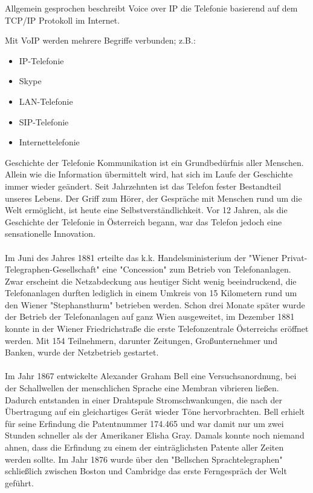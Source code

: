 \label{Grundlagen von VoIP}
	Allgemein gesprochen beschreibt Voice over IP die Telefonie basierend auf dem \ac{TCP/IP} Protokoll im Internet.
	
	Mit VoIP werden mehrere Begriffe verbunden; z.B.:
	\begin{itemize}
		\item \ac{IP}-Telefonie
		\item Skype
		\item \ac{LAN}-Telefonie
		\item \ac{SIP}-Telefonie
		\item Internettelefonie
	\end{itemize}

 \label{Geschichte der Telefonie}
 \begin{section}{Geschichte der Telefonie}
 	Kommunikation ist ein Grundbedürfnis aller Menschen. Allein wie die Information übermittelt wird, 
 	hat sich im Laufe der Geschichte immer wieder geändert. 
 	Seit Jahrzehnten ist das Telefon fester Bestandteil unseres Lebens. 
 	Der Griff zum Hörer, der Gespräche mit Menschen rund um die Welt ermöglicht, 
 	ist heute eine Selbstverständlichkeit. Vor 12 Jahren, 
 	als die Geschichte der Telefonie in Österreich begann, war das Telefon jedoch eine sensationelle Innovation. \\
 	\\
 	Im Juni des Jahres 1881 erteilte das k.k. Handelsministerium der "Wiener Privat-Telegraphen-Gesellschaft" 
 	eine "Concession" zum Betrieb von Telefonanlagen. Zwar erscheint die Netzabdeckung aus 
 	heutiger Sicht wenig beeindruckend, die Telefonanlagen durften lediglich in einem Umkreis 
 	von 15 Kilometern rund um den Wiener "Stephansthurm" betrieben werden. 
 	Schon drei Monate später wurde der Betrieb der Telefonanlagen auf ganz Wien ausgeweitet, 
 	im Dezember 1881 konnte in der Wiener Friedrichstraße die erste Telefonzentrale Österreichs 
 	eröffnet werden. Mit 154 Teilnehmern, darunter Zeitungen, Großunternehmer und Banken, 
 	wurde der Netzbetrieb gestartet. \\
 	\\
 	Im Jahr 1867 entwickelte Alexander Graham Bell eine Versuchsanordnung, 
 	bei der Schallwellen der menschlichen Sprache eine Membran vibrieren ließen. 
 	Dadurch entstanden in einer Drahtspule Stromschwankungen, 
 	die nach der Übertragung auf ein gleichartiges Gerät wieder Töne hervorbrachten. 
 	Bell erhielt für seine Erfindung die Patentnummer 174.465 und war damit nur um zwei Stunden 
 	schneller als der Amerikaner Elisha Gray. Damals konnte noch niemand ahnen, 
 	dass die Erfindung zu einem der einträglichsten Patente aller Zeiten werden sollte. 
 	Im Jahr 1876 wurde über den "Bellschen Sprachtelegraphen" schließlich zwischen 
 	Boston und Cambridge das erste Ferngespräch der Welt geführt.
 	\pagebreak
 	

\end{section}
